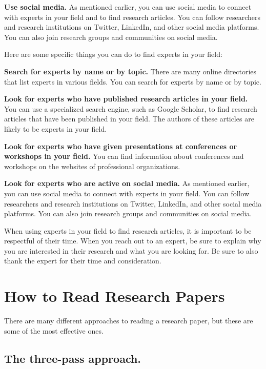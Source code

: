 \documentclass[
]{book}
\begin{document}
\textbf{Use social media.} As mentioned earlier, you can use social media to connect with experts in your field and to find research articles. You can follow researchers and research institutions on Twitter, LinkedIn, and other social media platforms. You can also join research groups and communities on social media.

Here are some specific things you can do to find experts in your field:

\textbf{Search for experts by name or by topic.} There are many online directories that list experts in various fields. You can search for experts by name or by topic.

\textbf{Look for experts who have published research articles in your field.} You can use a specialized search engine, such as Google Scholar, to find research articles that have been published in your field. The authors of these articles are likely to be experts in your field.

\textbf{Look for experts who have given presentations at conferences or workshops in your field.} You can find information about conferences and workshops on the websites of professional organizations.

\textbf{Look for experts who are active on social media.} As mentioned earlier, you can use social media to connect with experts in your field. You can follow researchers and research institutions on Twitter, LinkedIn, and other social media platforms. You can also join research groups and communities on social media.

When using experts in your field to find research articles, it is important to be respectful of their time. When you reach out to an expert, be sure to explain why you are interested in their research and what you are looking for. Be sure to also thank the expert for their time and consideration.

\section{How to Read Research Papers}\label{read}

There are many different approaches to reading a research paper, but these are some of the most effective ones.

\subsection*{The three-pass approach.}\label{the-three-pass-approach.}
\end{document}
